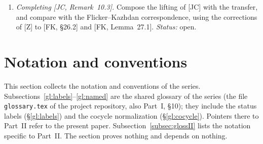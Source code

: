 \documentclass[12pt]{article}
\theoremstyle{plain}
\theoremstyle{definition}
\begin{document}
\begin{enumerate}[label=(\roman*),start=2]
\item \emph{Completing [JC, Remark~10.3].} Compose the lifting of [JC] with the transfer, and compare with the Flicker--Kazhdan correspondence, using the corrections of [Z] to [FK, \S26.2] and [FK, Lemma~27.1]. \emph{Status:} open.
\end{enumerate}

\section{Notation and conventions}\label{sec:glossary}
This section collects the notation and conventions of the series. Subsections~\ref{gl:labels}--\ref{gl:named} are the shared glossary of the series (the file \texttt{glossary.tex} of the project repository, also Part~I, \S10); they include the status labels (\S\ref{gl:labels}) and the cocycle normalization (\S\ref{gl:cocycle}). Pointers there to Part~II refer to the present paper. Subsection~\ref{subsec:glossII} lists the notation specific to Part~II. The section proves nothing and depends on nothing.


\end{document}
